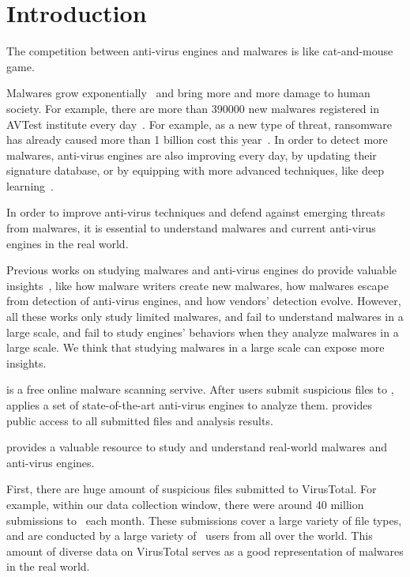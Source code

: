 \section{Introduction}
\label{sec:intro}



The competition between anti-virus engines and malwares is like cat-and-mouse game. 

Malwares grow exponentially~\cite{avtest} and bring more and more damage to human society. 
For example, there are more than 390000 new malwares registered in AVTest institute every day~\cite{avtest}.
For example, as a new type of threat, ransomware has already caused more than 1 billion cost this year~\cite{ransomware}. 
In order to detect more malwares, anti-virus engines are also improving every day, 
by updating their signature database, 
or by equipping with more advanced techniques, like deep learning~\cite{cylance}. 

In order to improve anti-virus techniques and defend against emerging threats from malwares, 
it is essential to understand malwares and current anti-virus engines in the real world. 

Previous works on studying malwares and anti-virus engines do provide valuable 
insights~\cite{ZhouSP2012,GuptaComsnets2009, vendors-study}, like  
how malware writers create new malwares, how malwares escape from detection of anti-virus engines, 
and how vendors' detection evolve. 
However, all these works only study limited malwares, 
and fail to understand malwares in a large scale, 
and fail to study engines' behaviors when they analyze malwares in a large scale. 
We think that studying malwares in a large scale can expose more insights. 

\vt{} is a free online malware scanning servive.
After users submit suspicious files to \vt{}, \vt{} applies a set of state-of-the-art anti-virus engines to analyze them. 
\vt{} provides public access to all submitted files and analysis results. 


\vt{} provides a valuable resource to study and 
understand real-world malwares and anti-virus engines. 

First, there are huge amount of suspicious files submitted to VirusTotal. 
For example, within our data collection window, 
there were around 40 million submissions to \vt\ each month. 
These submissions cover a large variety of file types, and 
are conducted by a large variety of \vt\ users from all over the world. 
This amount of diverse data on VirusTotal serves as a good representation of malwares in the real world.  

